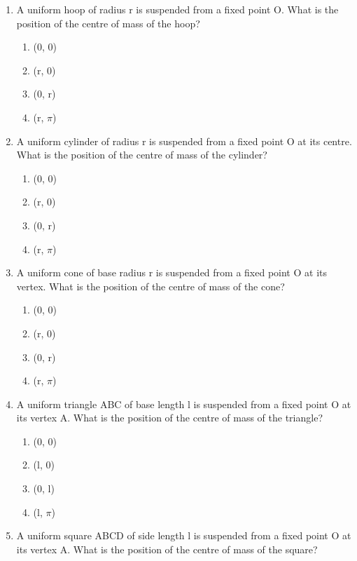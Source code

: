 \begin{enumerate}
\item A uniform hoop of radius r is suspended from a fixed point O. What is the position of the centre of mass of the hoop?

\begin{enumerate}
    \item (0, 0)
    \item (r, 0)
    \item (0, r)
    \item (r, $\pi$)
\end{enumerate}

\item A uniform cylinder of radius r is suspended from a fixed point O at its centre. What is the position of the centre of mass of the cylinder?

\begin{enumerate}
    \item (0, 0)
    \item (r, 0)
    \item (0, r)
    \item (r, $\pi$)
\end{enumerate}

\item A uniform cone of base radius r is suspended from a fixed point O at its vertex. What is the position of the centre of mass of the cone?

\begin{enumerate}
    \item (0, 0)
    \item (r, 0)
    \item (0, r)
    \item (r, $\pi$)
\end{enumerate}

\item A uniform triangle ABC of base length l is suspended from a fixed point O at its vertex A. What is the position of the centre of mass of the triangle?

\begin{enumerate}
    \item (0, 0)
    \item (l, 0)
    \item (0, l)
    \item (l, $\pi$)
\end{enumerate}

\item A uniform square ABCD of side length l is suspended from a fixed point O at its vertex A. What is the position of the centre of mass of the square?


\end{enumerate}
